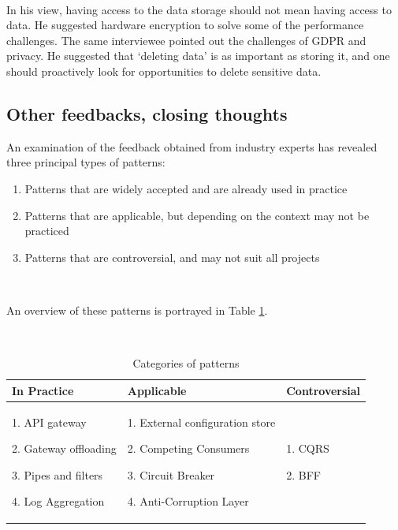\documentclass{bmcart}
\begin{document}
\,

In his view, having access to the data storage should not mean having access to data. He suggested hardware encryption to solve some of the performance challenges. The same interviewee pointed out the challenges of GDPR and privacy. He suggested that `deleting data' is as important as storing it, and one should proactively look for opportunities to delete sensitive data. 



\subsection{Other feedbacks, closing thoughts}

An examination of the feedback obtained from industry experts has revealed three principal types of patterns: 

\begin{enumerate}
  \item Patterns that are widely accepted and are already used in practice
  \item Patterns that are applicable, but depending on the context may not be practiced 
  \item Patterns that are controversial, and may not suit all projects
\end{enumerate}

\,

An overview of these patterns is portrayed in Table \ref{tab:patternCategories}. 

\,

\begin{table}[h]
  \renewcommand{\arraystretch}{1.5}
  \caption{Categories of patterns}
  \label{tab:patternCategories}

  \begin{tabular}{|p{3.3cm}|p{4.6cm}|p{3.5cm}|}
    \hline
    \textbf{In Practice} & \textbf{Applicable} & \textbf{Controversial} \\

    \hline
    
    
         1. API gateway
  
         2. Gateway offloading
  
         3. Pipes and filters
  
         4. Log Aggregation
     & 
  
         1. External configuration store
  
         2. Competing Consumers
  
         3. Circuit Breaker
  
         4. Anti-Corruption Layer
     
    & 
  
         1. CQRS
  
         2. BFF
    \\
    \hline
  \end{tabular}
\end{table}
\end{document}
